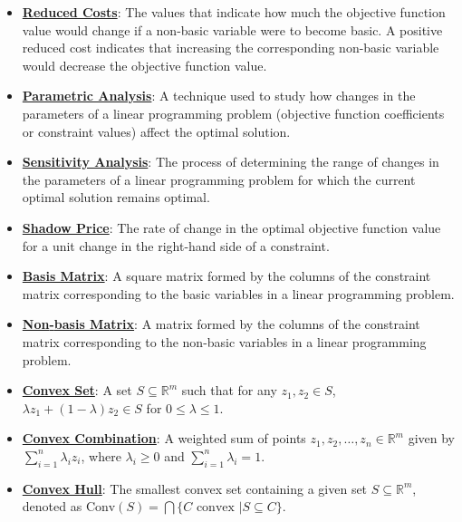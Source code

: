 \documentclass{article}%
\begin{document}
\begin{itemize}[leftmargin=*]
\item \href{https://www.math.purdue.edu/~yipn/421/2024-09-26-Sensitivity.pdf#page=7}{\textbf{Reduced Costs}}: The values that indicate how much the objective function value would change if a non-basic variable were to become basic. A positive reduced cost indicates that increasing the corresponding non-basic variable would decrease the objective function value.%
\item \href{https://www.math.purdue.edu/~yipn/421/2024-09-26-Sensitivity.pdf#page=4}{\textbf{Parametric Analysis}}: A technique used to study how changes in the parameters of a linear programming problem (objective function coefficients or constraint values) affect the optimal solution.%
\item \href{https://www.math.purdue.edu/~yipn/421/2024-09-26-Sensitivity.pdf#page=1}{\textbf{Sensitivity Analysis}}: The process of determining the range of changes in the parameters of a linear programming problem for which the current optimal solution remains optimal.%
\item \href{https://www.math.purdue.edu/~yipn/421/2024-10-01-SensitivityDuality.pdf#page=10}{\textbf{Shadow Price}}: The rate of change in the optimal objective function value for a unit change in the right-hand side of a constraint.%
\item \href{https://www.math.purdue.edu/~yipn/421/2024-10-01-SensitivityDuality.pdf#page=4}{\textbf{Basis Matrix}}: A square matrix formed by the columns of the constraint matrix corresponding to the basic variables in a linear programming problem.%
\item \href{https://www.math.purdue.edu/~yipn/421/2024-10-01-SensitivityDuality.pdf#page=4}{\textbf{Non{-}basis Matrix}}: A matrix formed by the columns of the constraint matrix corresponding to the non-basic variables in a linear programming problem.%
\item \href{https://www.math.purdue.edu/~yipn/421/2024-10-22-Convexity.pdf#page=1}{\textbf{Convex Set}}: A set $S \subseteq \mathbb{R}^m$ such that for any $z_1, z_2 \in S$, $\lambda z_1 + (1-\lambda) z_2 \in S$ for $0 \le \lambda \le 1$.%
\item \href{https://www.math.purdue.edu/~yipn/421/2024-10-22-Convexity.pdf#page=1}{\textbf{Convex Combination}}: A weighted sum of points $z_1, z_2, \dots, z_n \in \mathbb{R}^m$ given by $\sum_{i=1}^n \lambda_i z_i$, where $\lambda_i \ge 0$ and $\sum_{i=1}^n \lambda_i = 1$.%
\item \href{https://www.math.purdue.edu/~yipn/421/2024-10-22-Convexity.pdf#page=5}{\textbf{Convex Hull}}: The smallest convex set containing a given set $S \subseteq \mathbb{R}^m$, denoted as $\text{Conv}(S) = \bigcap \{C \text{ convex } | S \subseteq C\}$.%

\end{itemize}
\end{document}
